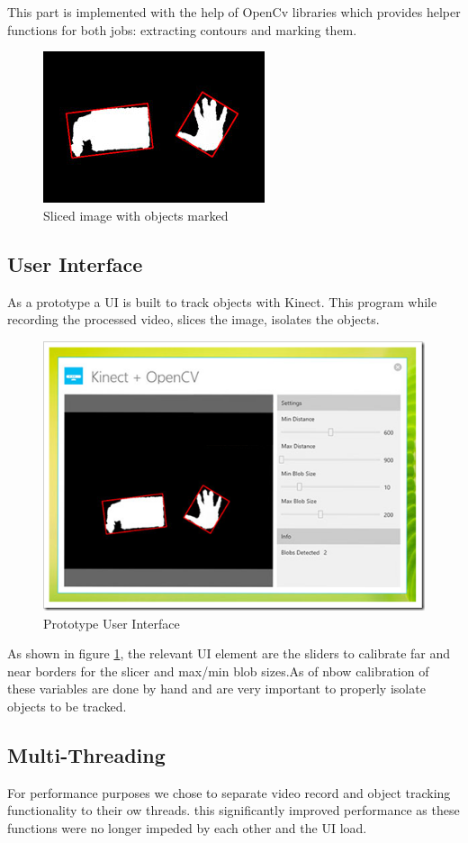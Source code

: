 This part is implemented with the help of OpenCv libraries which provides helper functions for both jobs: extracting contours and marking them.
\begin{figure}[htb]
\centering
\includegraphics[scale=2]{./tracker} %
\caption{Sliced image with objects marked}
\label{fig:label31} %
\end{figure}
\subsection{User Interface}
As a prototype a UI is built to track objects with Kinect. This program while recording the processed video, slices the image, isolates the objects. 
\begin{figure}[htb]
\centering
\includegraphics[scale=1]{./UI} %
\caption{Prototype User Interface}
\label{fig:label32} %
\end{figure}

As shown in figure \ref{fig:label31}, the relevant UI element are the sliders to calibrate far and near borders for the slicer and max/min blob sizes.As of nbow calibration of these variables are done by hand and are very important to properly isolate objects to be tracked.
\subsection{Multi-Threading}
For performance purposes we chose to separate video record and object tracking functionality to their ow threads. this significantly improved performance as these functions were no longer impeded by each other and the UI load.

